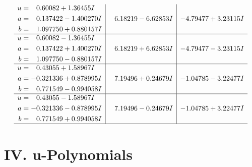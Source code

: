\documentclass[1p]{elsarticle_modified}
\theoremstyle{definition}
\begin{document}
$$\begin{array}{c|c|c}
\begin{aligned}
u &= \phantom{-}0.60082 + 1.36455 I \\
a &= \phantom{-}0.137422 - 1.400270 I \\
b &= \phantom{-}1.097750 + 0.880157 I\end{aligned}
 & \phantom{-}6.18219 - 6.62853 I & -4.79477 + 3.23115 I \\ \hline\begin{aligned}
u &= \phantom{-}0.60082 - 1.36455 I \\
a &= \phantom{-}0.137422 + 1.400270 I \\
b &= \phantom{-}1.097750 - 0.880157 I\end{aligned}
 & \phantom{-}6.18219 + 6.62853 I & -4.79477 - 3.23115 I \\ \hline\begin{aligned}
u &= \phantom{-}0.43055 + 1.58967 I \\
a &= -0.321336 + 0.878995 I \\
b &= \phantom{-}0.771549 - 0.994058 I\end{aligned}
 & \phantom{-}7.19496 + 0.24679 I & -1.04785 - 3.22477 I \\ \hline\begin{aligned}
u &= \phantom{-}0.43055 - 1.58967 I \\
a &= -0.321336 - 0.878995 I \\
b &= \phantom{-}0.771549 + 0.994058 I\end{aligned}
 & \phantom{-}7.19496 - 0.24679 I & -1.04785 + 3.22477 I\\
 \hline 
 \end{array}$$\newpage
\newpage\renewcommand{\arraystretch}{1}
\centering \section*{ IV. u-Polynomials}
\end{document}
